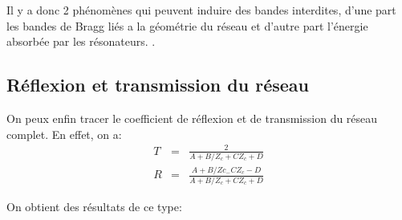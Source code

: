 Il y a donc 2 phénomènes qui peuvent induire des bandes interdites, d'une part les bandes de Bragg liés a la géométrie du réseau et d'autre part l'énergie absorbée par les résonateurs.
.


\subsection{Réflexion et transmission du réseau}
On peux enfin tracer le coefficient de réflexion et de transmission du réseau complet. En effet, on a:
\begin{eqnarray}
T & = & \frac{2}{A + B/Z_c + C Z_c + D} \\
R & = & \frac{A + B / Zc_ - C Z_c -D}{A + B/Z_c + C Z_c + D} 
\end{eqnarray}

On obtient des résultats de ce type:
